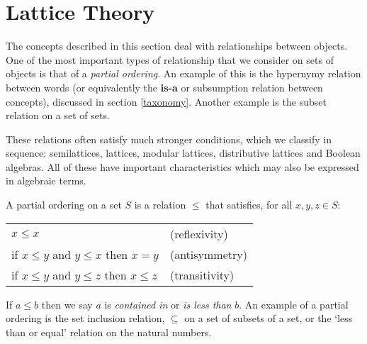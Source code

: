 \documentclass[12pt]{report}
\begin{document}
\section{Lattice Theory}
\label{lattices}

The concepts described in this section deal with relationships between objects. One of the most important types of relationship that we consider on sets of objects is that of a \emph{partial ordering}. An example of this is the hypernymy relation between words (or equivalently the \textbf{is-a} or subsumption relation between concepts), discussed in section \ref{taxonomy}. Another example is the subset relation on a set of sets.

These relations often satisfy much stronger conditions, which we classify in sequence: semilattices, lattices, modular lattices, distributive lattices and Boolean algebras. All of these have important characteristics which may also be expressed in algebraic terms.


\begin{defn}
A partial ordering on a set $S$ is a relation $\le$ that satisfies, for all $x,y,z \in S$:
\begin{center}
\begin{tabular}{ll}
$x \le x$ & (reflexivity)\\
if $x \le y$ and $y \le x$ then $x = y$ & (antisymmetry) \\
if $x \le y$ and $y \le z$ then $x \le z$ & (transitivity)
\end{tabular}
\end{center}
\end{defn}
If $a \le b$ then we say $a$ is \emph{contained in} or \emph{is less than} $b$. An example of a partial ordering is the set inclusion relation, $\subseteq$ on a set of subsets of a set, or the `less than or equal' relation on the natural numbers.
\end{document}
